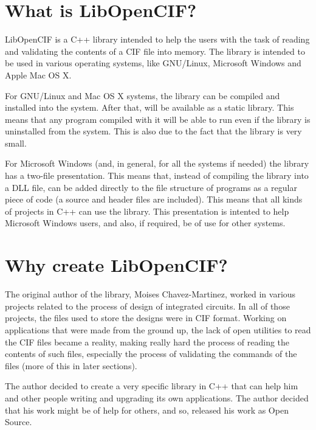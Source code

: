 \documentclass[11pt,twoside,openany,x11names,svgnames]{memoir}
\begin{document}
\section{What is LibOpenCIF?}\label{What-is-LibOpenCIF}

LibOpenCIF is a C++ library intended to help the users with the task of reading and validating the contents of a CIF file into memory. The library is intended to be used in various operating systems, like GNU/Linux, Microsoft Windows and Apple Mac OS X.

For GNU/Linux and Mac OS X systems, the library can be compiled and installed into the system. After that, will be available as a static library. This means that any program compiled with it will be able to run even if the library is uninstalled from the system. This is also due to the fact that the library is very small.

For Microsoft Windows (and, in general, for all the systems if needed) the library has a two-file presentation. This means that, instead of compiling the library into a DLL file, can be added directly to the file structure of programs as a regular piece of code (a source and header files are included). This means that all kinds of projects in C++ can use the library. This presentation is intented to help Microsoft Windows users, and also, if required, be of use for other systems.

\section{Why create LibOpenCIF?}\label{Why-create-LibOpenCIF}

The original author of the library, Moises Chavez-Martinez, worked in various projects related to the process of design of integrated circuits. In all of those projects, the files used to store the designs were in CIF format. Working on applications that were made from the ground up, the lack of open utilities to read the CIF files became a reality, making really hard the process of reading the contents of such files, especially the process of validating the commands of the files (more of this in later sections).

The author decided to create a very specific library in C++ that can help him and other people writing and upgrading its own applications. The author decided that his work might be of help for others, and so, released his work as Open Source.
\end{document}
